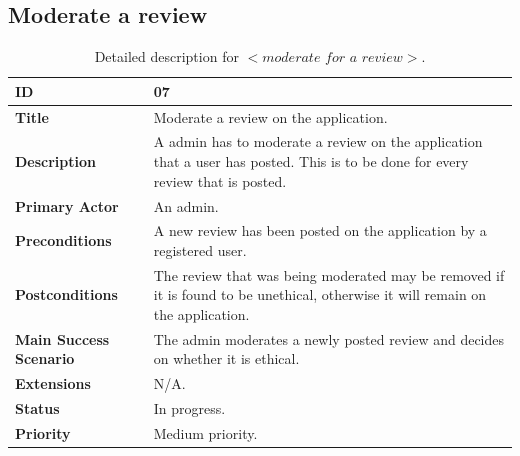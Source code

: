 \documentclass[11pt]{extarticle}
\begin{document}
\subsection{Moderate a review}
\begin{table}[H]
    \begin{center}
        \begin{tabular}{ |m{6cm}|p{6cm}| } 
           \hline
           \textbf{ID} & 07\\
           \hline
           \textbf{Title} & Moderate a review on the application.\\
           \hline
           \textbf{Description} & A admin has to moderate a review on the application that a user has posted. This is to be done for every review that is posted.\\
           \hline
           \textbf{Primary Actor} & An admin.\\
           \hline
           \textbf{Preconditions} & A new review has been posted on the application by a registered user.\\
           \hline
           \textbf{Postconditions} & The review that was being moderated may be removed if it is found to be unethical, otherwise it will remain on the application.\\
           \hline
           \textbf{Main Success Scenario} & The admin moderates a newly posted review and decides on whether it is ethical.\\
           \hline
           \textbf{Extensions} & N/A.\\
           \hline
           \textbf{Status} & In progress.\\
           \hline
           \textbf{Priority} & Medium priority.\\
           \hline
        \end{tabular}
    \end{center}
    \caption{\label{tab:Table 7} Detailed description for $<\textit{moderate for a review}>$.}
\end{table}
\end{document}

